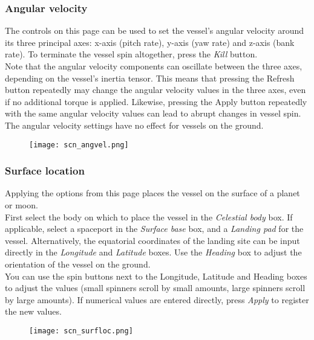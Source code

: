 \documentclass[Orbiter User Manual.tex]{subfiles}
\begin{document}
\subsubsection{Angular velocity}
The controls on this page can be used to set the vessel's angular velocity around its three principal axes: x-axis (pitch rate), y-axis (yaw rate) and z-axis (bank rate). To terminate the vessel spin altogether, press the \textit{Kill} button.\\
Note that the angular velocity components can oscillate between the three axes, depending on the vessel's inertia tensor. This means that pressing the Refresh button repeatedly may change the angular velocity values in the three axes, even if no additional torque is applied. Likewise, pressing the Apply button repeatedly with the same angular velocity values can lead to abrupt changes in vessel spin.\\
The angular velocity settings have no effect for vessels on the ground.

\begin{figure}[H]
	\centering
	\texttt{[image: scn\_angvel.png]}
\end{figure}

\subsubsection{Surface location}
\label{sssec:scneditor_surface}
Applying the options from this page places the vessel on the surface of a planet or moon.\\
First select the body on which to place the vessel in the \textit{Celestial body} box. If applicable, select a spaceport in the \textit{Surface base} box, and a \textit{Landing pad} for the vessel. Alternatively, the equatorial coordinates of the landing site can be input directly in the \textit{Longitude} and \textit{Latitude} boxes. Use the \textit{Heading} box to adjust the orientation of the vessel on the ground.\\
You can use the spin buttons next to the Longitude, Latitude and Heading boxes to adjust the values (small spinners scroll by small amounts, large spinners scroll by large amounts). If numerical values are entered directly, press \textit{Apply} to register the new values.

\begin{figure}[H]
	\centering
	\texttt{[image: scn\_surfloc.png]}
\end{figure}

\noindent
\end{document}
